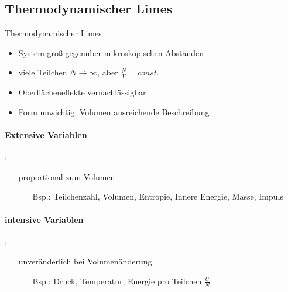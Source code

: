 \subsection{Thermodynamischer Limes}
\begin{definition}{Thermodynamischer Limes}
\begin{itemize}
    \item System groß gegenüber mikroskopischen Abständen
    \item viele Teilchen $N\to \infty$, aber $\frac{N}{V}=const.$
    \item Oberflächeneffekte vernachlässigbar
    \item Form unwichtig, Volumen ausreichende Beschreibung
\end{itemize}

\paragraph{Extensive Variablen}:
\begin{itemize}
    \item[] proportional zum Volumen
    \begin{itemize}
        \item[Bsp.:] Teilchenzahl, Volumen, Entropie, Innere Energie, Masse, Impuls
    \end{itemize}
\end{itemize}

\paragraph{intensive Variablen}:
\begin{itemize}
    \item[] unveränderlich bei Volumenänderung
    \begin{itemize}
        \item[Bsp.:] Druck, Temperatur, Energie pro Teilchen $\frac{U}{N}$
    \end{itemize}
\end{itemize}
\end{definition}







